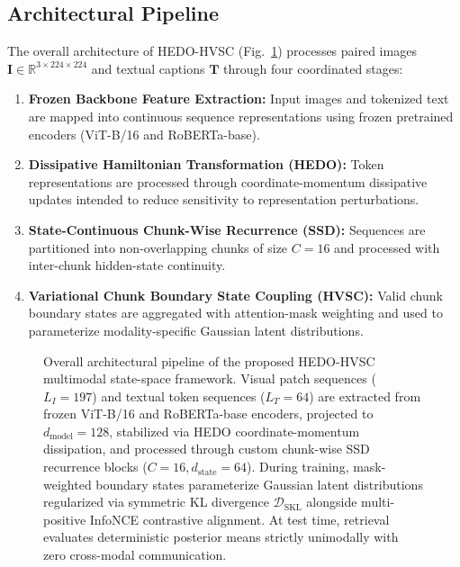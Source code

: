\documentclass[journal]{IEEEtran}
\begin{document}
\subsection{Architectural Pipeline}
The overall architecture of HEDO-HVSC (Fig.~\ref{fig:overall_architecture}) processes paired images $\mathbf{I} \in \mathbb{R}^{3 \times 224 \times 224}$ and textual captions $\mathbf{T}$ through four coordinated stages:
\begin{enumerate}
    \item \textbf{Frozen Backbone Feature Extraction:} Input images and tokenized text are mapped into continuous sequence representations using frozen pretrained encoders (ViT-B/16 and RoBERTa-base).
    \item \textbf{Dissipative Hamiltonian Transformation (HEDO):} Token representations are processed through coordinate-momentum dissipative updates intended to reduce sensitivity to representation perturbations.
    \item \textbf{State-Continuous Chunk-Wise Recurrence (SSD):} Sequences are partitioned into non-overlapping chunks of size $C=16$ and processed with inter-chunk hidden-state continuity.
    \item \textbf{Variational Chunk Boundary State Coupling (HVSC):} Valid chunk boundary states are aggregated with attention-mask weighting and used to parameterize modality-specific Gaussian latent distributions.
\end{enumerate}

\begin{figure}[!t]
\centering
\HEDOArchitectureFigure
\caption{Overall architectural pipeline of the proposed HEDO-HVSC multimodal state-space framework. Visual patch sequences ($L_I=197$) and textual token sequences ($L_T=64$) are extracted from frozen ViT-B/16 and RoBERTa-base encoders, projected to $d_{\text{model}}=128$, stabilized via HEDO coordinate-momentum dissipation, and processed through custom chunk-wise SSD recurrence blocks ($C=16, d_{\text{state}}=64$). During training, mask-weighted boundary states parameterize Gaussian latent distributions regularized via symmetric KL divergence $\mathcal{D}_{\text{SKL}}$ alongside multi-positive InfoNCE contrastive alignment. At test time, retrieval evaluates deterministic posterior means strictly unimodally with zero cross-modal communication.}
\label{fig:overall_architecture}
\end{figure}
\end{document}
